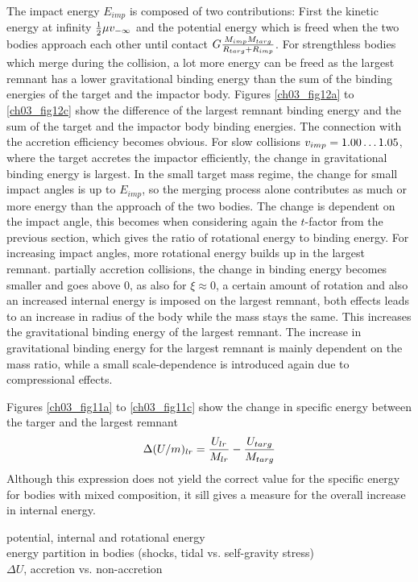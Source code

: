 The impact energy $E_{imp}$ is composed of two contributions: First the kinetic energy at infinity $\frac{1}{2} \mu v_{-\infty}$ and the potential energy which is freed when the two bodies approach each other until contact $G\frac{M_{imp} M_{targ}}{R_{targ} + R_{imp}}$. For strengthless bodies which merge during the collision, a lot more energy can be freed as the largest remnant has a lower gravitational binding energy than the sum of the binding energies of the target and the impactor body. Figures \ref{ch03_fig12a} to \ref{ch03_fig12c} show the difference of the largest remnant binding energy and the sum of the target and the impactor body binding energies. The connection with the accretion efficiency becomes obvious. For slow collisions $v_{imp} = 1.00 \dots 1.05$, where the target accretes the impactor efficiently, the change in gravitational binding energy is largest. In the small target mass regime, the change for small impact angles is up to $E_{imp}$, so the merging process alone contributes as much or more energy than the approach of the two bodies. The change is dependent on the impact angle, this becomes when considering again the $t$-factor from the previous section, which gives the ratio of rotational energy to binding energy. For increasing impact angles, more rotational energy builds up in the largest remnant. partially accretion collisions, the change in binding energy becomes smaller and goes above 0, as also for $\xi \approx 0$, a certain amount of rotation and also an increased internal energy is imposed on the largest remnant, both effects leads to an increase in radius of the body while the mass stays the same. This increases the gravitational binding energy of the largest remnant. The increase in gravitational binding energy for the largest remnant is mainly dependent on the mass ratio, while a small scale-dependence is introduced again due to compressional effects.

Figures \ref{ch03_fig11a} to \ref{ch03_fig11c} show the change in specific energy between the targer and the largest remnant 
\begin{align}
\Delta (U / m )_{lr} = \frac{U_{lr}}{M_{lr}} - \frac{U_{targ}}{M_{targ}} 
\end{align}
Although this expression does not yield the correct value for the specific energy for bodies with mixed composition, it sill gives a measure for the overall increase in internal energy. 



potential, internal and rotational energy\\
energy partition in bodies (shocks, tidal vs. self-gravity stress) \\
$\Delta U$, accretion vs. non-accretion \\

